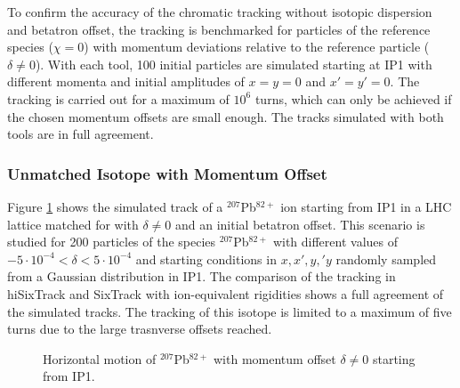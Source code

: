To confirm the accuracy of the chromatic tracking without isotopic dispersion and betatron offset, the tracking is benchmarked for particles of the reference species ($\chi=0$) with momentum deviations relative to the reference particle ($\delta\neq0$). With each tool, 100 initial particles are simulated starting at IP1 with different momenta and initial amplitudes of $x=y=0$ and $x'=y'=0$. The tracking is carried out for a maximum of $10^6$ turns, which can only be achieved if the chosen momentum offsets are small enough. The tracks simulated with both tools are in full agreement.


\subsubsection{Unmatched Isotope with Momentum Offset}
Figure \ref{pic:16070801} shows the simulated track of a $^{207}$Pb$^{82+}$ ion starting from IP1 in a LHC lattice matched for \lead with $\delta \neq 0$ and an initial betatron offset. This scenario is studied for 200 particles of the species $^{207}$Pb$^{82+}$ with different values of $-5 \cdot 10^{-4} < \delta < 5 \cdot 10^{-4}$ and starting conditions in $x,x',y,'y$ randomly sampled from a Gaussian distribution in IP1. The comparison of the tracking in hiSixTrack and SixTrack with ion-equivalent rigidities shows a full agreement of the simulated tracks. The tracking of this isotope is limited to a maximum of five turns due to the large trasnverse offsets reached. 

\begin{figure}[htbp]
  \centering
  \caption{Horizontal motion of $^{207}$Pb$^{82+}$ with momentum offset $\delta \neq 0$ starting from IP1.}  
  \label{pic:16070801}
  \end{figure}



